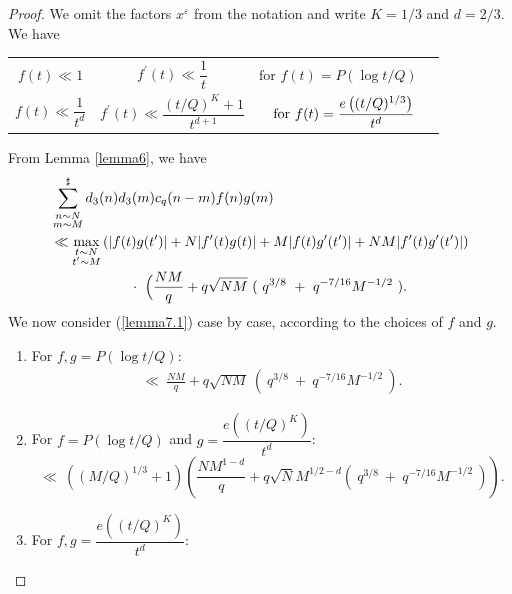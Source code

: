 \documentclass[oneside,reqno,10pt]{amsart}
\numberwithin{equation}{section}
\theoremstyle{plain}
\theoremstyle{definition}
\numberwithin{equation}{section}
\begin{document}
\begin{proof}
    We omit the factors $x^{\varepsilon}$ from the notation and write $K=1/3$ and $d=2/3$. We have

\begin{center}
    \begin{tabular}{c c c c}
       $f(t) \ll 1$ &  $f^{\prime}(t) \ll \dfrac{1}{t}$  &\hspace{0.25 cm} $\text{for } f(t) = P(\log t/Q)$ \\
       $f(t) \ll \dfrac{1}{t^{d}}$ &\hspace{0.9 cm} $f^{\prime}(t) \ll \dfrac{(t/Q)^{K} + 1}{t^{d+1}}$  & $\hspace{0.3 cm}\text{for } f(t) = \dfrac{e\left((t/Q)^{1/3}\right)}{t^{d}}$
    \end{tabular}
\end{center}
From Lemma \ref{lemma6}, we have
\begin{align}\label{lemma7.1}
    &\sum_{\begin{subarray}{c}n \sim N \\ m \sim M\end{subarray}}^{\sharp} d_{3}(n)d_{3}(m)c_{q}(n-m)f(n)g(m)\\
    &\ll \max_{\substack{t \sim N \\t^{\prime} \sim M}} \left(|f(t)g(t^{\prime})| + N|f^{\prime}(t)g(t)| + M|f(t)g^{\prime}(t^{\prime})| + NM|f^{\prime}(t)g^{\prime}(t^{\prime})|\right)\\ \nonumber
    &\hspace{2cm}\cdot\ \Big( \frac{NM}{q}+ q\sqrt{NM}\ (\ q^{3/8}\ +\ q^{-7/16}M^{-1/2}\ ).\nonumber
\end{align}
We now consider (\ref{lemma7.1}) case by case, according to the choices of $f$ and $g$.
\begin{enumerate}
    \item For $f,g=P(\log t/Q)$:\\
    \begin{align*}
        \ll\  \frac{NM}{q}+ q\sqrt{NM}\ (\ q^{3/8}\ +\ q^{-7/16}M^{-1/2}\ ).
    \end{align*}
    \item For $f=P(\log t/Q)$ and $g=\dfrac{e((t/Q)^{K})}{t^d}$:\\
    \begin{equation*}
        \ll\  \left((M/Q)^{1/3} + 1\right) \left(\frac{NM^{1-d}}{q} + q\sqrt{N}M^{1/2-d}(\ q^{3/8}\ +\ q^{-7/16}M^{-1/2}\ )\right).
    \end{equation*}
    \item For $f,g=\dfrac{e((t/Q)^{K})}{t^d}$:\\

\end{enumerate}
\end{proof}
\end{document}
